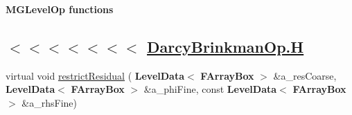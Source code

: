 \begin{Indent}\textbf{ M\+G\+Level\+Op functions}\par
{\em \subsection*{$<$$<$$<$$<$$<$$<$$<$ \hyperlink{_darcy_brinkman_op_8_h_source}{Darcy\+Brinkman\+Op.\+H} }}\begin{DoxyCompactItemize}
\item 
virtual void \hyperlink{class_darcy_brinkman_op_a22da926f24eef3899c539896dc6cc314}{restrict\+Residual} (\textbf{ Level\+Data}$<$ \textbf{ F\+Array\+Box} $>$ \&a\+\_\+res\+Coarse, \textbf{ Level\+Data}$<$ \textbf{ F\+Array\+Box} $>$ \&a\+\_\+phi\+Fine, const \textbf{ Level\+Data}$<$ \textbf{ F\+Array\+Box} $>$ \&a\+\_\+rhs\+Fine)
\end{DoxyCompactItemize}
\end{Indent}
